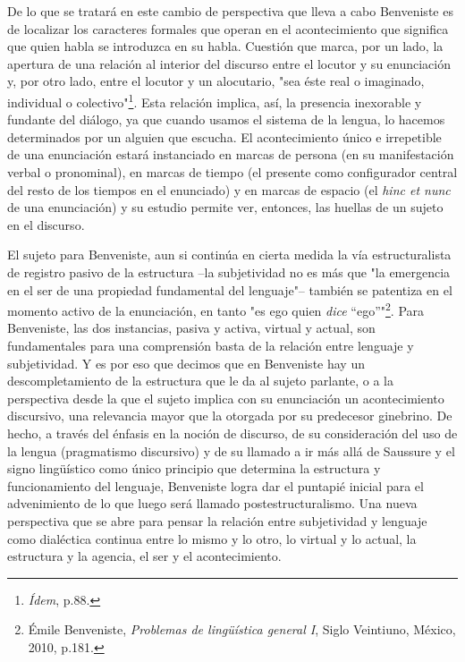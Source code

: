 \documentclass{book}
\begin{document}
De lo que se tratará en este cambio de perspectiva que lleva a cabo
Benveniste es de localizar los caracteres formales que operan en el
acontecimiento que significa que quien habla se introduzca en su habla.
Cuestión que marca, por un lado, la apertura de una relación al interior
del discurso entre el locutor y su enunciación y, por otro lado, entre
el locutor y un alocutario, "sea éste real o imaginado, individual o
colectivo"\footnote{\emph{Ídem}, p.88.}. Esta relación implica, así, la
presencia inexorable y fundante del diálogo, ya que cuando usamos el
sistema de la lengua, lo hacemos determinados por un alguien que
escucha. El acontecimiento único e irrepetible de una enunciación estará
instanciado en marcas de persona (en su manifestación verbal o
pronominal), en marcas de tiempo (el presente como configurador central
del resto de los tiempos en el enunciado) y en marcas de espacio (el
\emph{hinc et nunc} de una enunciación) y su estudio permite ver,
entonces, las huellas de un sujeto en el discurso.

El sujeto para Benveniste, aun si continúa en cierta medida la vía
estructuralista de registro pasivo de la estructura --la subjetividad no
es más que "la emergencia en el ser de una propiedad fundamental del
lenguaje"-- también se patentiza en el momento activo de la enunciación,
en tanto "es ego quien \emph{dice} ``ego''"\footnote{Émile Benveniste,
  \emph{Problemas de lingüística general I}, Siglo Veintiuno, México,
  2010, p.181.}. Para Benveniste, las dos instancias, pasiva y activa,
virtual y actual, son fundamentales para una comprensión basta de la
relación entre lenguaje y subjetividad. Y es por eso que decimos que en
Benveniste hay un descompletamiento de la estructura que le da al sujeto
parlante, o a la perspectiva desde la que el sujeto implica con su
enunciación un acontecimiento discursivo, una relevancia mayor que la
otorgada por su predecesor ginebrino. De hecho, a través del énfasis en
la noción de discurso, de su consideración del uso de la lengua
(pragmatismo discursivo) y de su llamado a ir más allá de Saussure y el
signo lingüístico como único principio que determina la estructura y
funcionamiento del lenguaje, Benveniste logra dar el puntapié inicial
para el advenimiento de lo que luego será llamado postestructuralismo.
Una nueva perspectiva que se abre para pensar la relación entre
subjetividad y lenguaje como dialéctica continua entre lo mismo y lo
otro, lo virtual y lo actual, la estructura y la agencia, el ser y el
acontecimiento.
\end{document}
